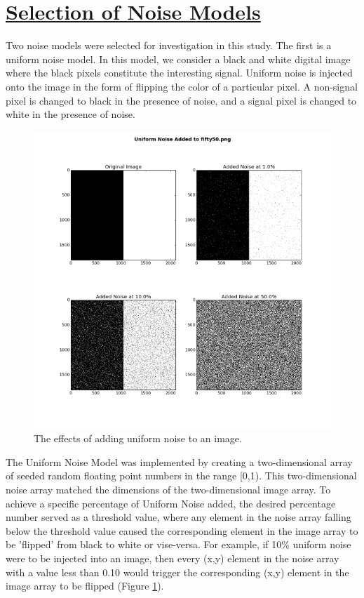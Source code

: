 \documentclass[12pt, oneside]{book}
\begin{document}
% 
%
\section{\underline{Selection of Noise Models}}
Two noise models were selected for investigation in this study.  The first is a uniform noise model.  In this model, we consider a black and white digital image where the black pixels constitute the interesting signal.  Uniform noise is injected onto the image in the form of flipping the color of a particular pixel.  A non-signal pixel is changed to black in the presence of noise, and a signal pixel is changed to white in the presence of noise.  

\begin{figure}[!b]
  \centering
  \includegraphics[width=\textwidth]{figures/uniform.png}
  \caption[The effects of adding uniform noise to an image.]{The effects of adding uniform noise to an image.}
  \label{fig:uniform}
\end{figure}

The Uniform Noise Model was implemented by creating a two-dimensional array of seeded random floating point numbers in the range [0,1). This two-dimensional noise array matched the dimensions of the two-dimensional image array.  To achieve a specific percentage of Uniform Noise added, the desired percentage number served as a threshold value, where any element in the noise array falling below the threshold value caused the corresponding element in the image array to be 'flipped' from black to white or vise-versa.  For example, if 10\% uniform noise were to be injected into an image, then every (x,y) element in the noise array with a value less than 0.10 would trigger the corresponding (x,y) element in the image array to be flipped (Figure \ref{fig:uniform}).
\end{document}
